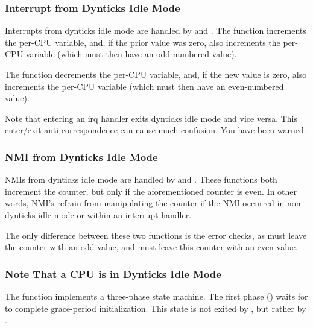 \subsubsection{Interrupt from Dynticks Idle Mode}
\label{app:rcuimpl:rcutree:Interrupt from Dynticks Idle Mode}

Interrupts from dynticks idle mode are handled by
 and .
The  function increments the
per-CPU  variable, and, if the prior
value was zero, also increments the 
per-CPU variable (which must then have an odd-numbered value).

The  function decrements the
per-CPU  variable, and, if the new
value is zero, also increments the 
per-CPU variable (which must then have an even-numbered value).

Note that entering an irq handler exits dynticks idle mode
and vice versa.
This enter/exit anti-correspondence can cause much confusion.
You have been warned.

\subsubsection{NMI from Dynticks Idle Mode}
\label{app:rcuimpl:rcutree:NMI from Dynticks Idle Mode}

NMIs from dynticks idle mode are handled by 
and .
These functions both increment the  counter,
but only if the aforementioned  counter is even.
In other words, NMI's refrain from manipulating the
 counter if the NMI occurred in non-dynticks-idle
mode or within an interrupt handler.

The only difference between these two functions is the error checks,
as  must leave the 
counter with an odd value, and  must leave
this counter with an even value.

\subsubsection{Note That a CPU is in Dynticks Idle Mode}
\label{app:rcuimpl:rcutree:Note That a CPU is in Dynticks Idle Mode}

The  function implements a
three-phase state machine.
The first phase () waits for 
to complete grace-period initialization.
This state is not exited by , but rather
by .

